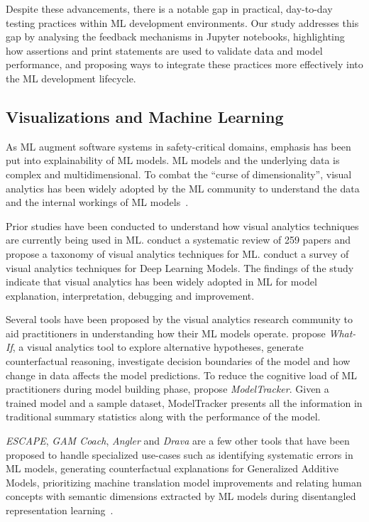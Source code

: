 \documentclass[smallextended]{svjour3}       %
\begin{document}
Despite these advancements, there is a notable gap in practical, day-to-day testing practices within ML development environments. Our study addresses this gap by analysing the feedback mechanisms in Jupyter notebooks, highlighting how assertions and print statements are used to validate data and model performance, and proposing ways to integrate these practices more effectively into the ML development lifecycle.

\subsection{Visualizations and Machine Learning}\label{sec:visualizations}

As ML augment software systems in safety-critical domains, emphasis has been put into explainability of ML models. ML models and the underlying data is complex and multidimensional. To combat the ``curse of dimensionality'', visual analytics has been widely adopted by the ML community to understand the data and the internal workings of ML models~\citep{yuan2021survey,hohman2019visual,wexler2019what-if}.

Prior studies have been conducted to understand how visual analytics techniques are currently being used in ML. \citet{yuan2021survey} conduct a systematic review of 259 papers and propose a taxonomy of visual analytics techniques for ML. \citet{hohman2019visual} conduct a survey of visual analytics techniques for Deep Learning Models. The findings of the study indicate that visual analytics has been widely adopted in ML for model explanation, interpretation, debugging and improvement.

Several tools have been proposed by the visual analytics research community to aid practitioners in understanding how their ML models operate. \citet{wexler2019what-if} propose \textit{What-If}, a visual analytics tool to explore alternative hypotheses, generate counterfactual reasoning, investigate decision boundaries of the model and how change in data affects the model predictions. To reduce the cognitive load of ML practitioners during model building phase, \citet{amershi2019software} propose \textit{ModelTracker}. Given a trained model and a sample dataset, ModelTracker presents all the information in traditional summary statistics along with the performance of the model.

\textit{ESCAPE}, \textit{GAM Coach}, \textit{Angler} and \textit{Drava} are a few other tools that have been proposed to handle specialized use-cases such as identifying systematic errors in ML models, generating counterfactual explanations for Generalized Additive Models, prioritizing machine translation model improvements and relating human concepts with semantic dimensions extracted by ML models during disentangled representation learning~\citep{ahn2023escape,wang2023gam,robertson2023angler,wang2023drava}.
\end{document}
